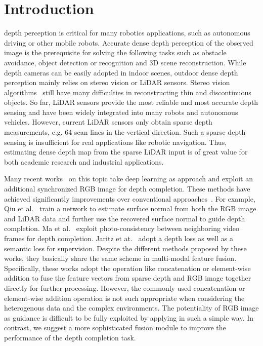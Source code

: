 \documentclass[journal]{IEEEtran}
\begin{document}
\section{Introduction}
 depth perception is critical for many robotics applications, such as autonomous driving or other mobile robots.
Accurate dense depth perception of the observed image is the prerequisite for solving the following tasks such as obstacle avoidance, object detection or recognition
and 3D scene reconstruction.
While depth cameras can be easily adopted in indoor scenes, outdoor dense depth perception mainly relies on stereo vision or LiDAR sensors.
Stereo vision algorithms~\cite{sgm,middleburry,cnn_stereo, efficient_stereo} still have many difficulties in reconstructing thin and discontinuous objects.
So far, LiDAR sensors provide the most reliable and most accurate depth sensing and have been widely integrated into many robots and autonomous vehicles.
However, current LiDAR sensors only obtain sparse depth measurements, e.g. 64 scan lines in the vertical direction.
Such a sparse depth sensing is insufficient for real applications like robotic navigation.
Thus, estimating dense depth map from the sparse LiDAR input is of great value for both academic research and industrial applications.
 

Many recent works~\cite{sparsity_cnn, deep_lidar, self_supervised}  on this topic take deep learning as approach and exploit an additional synchronized RGB image for depth completion.
These methods have achieved significantly improvements over conventional approaches~\cite{dense_disparity,sparse_sample,defense_classical}.
For example,  Qiu et al.~\cite{deep_lidar} train a network to estimate surface normal from both the RGB image and LiDAR data and further use the recovered surface normal to guide depth completion.
Ma et al.~\cite{self_supervised} exploit photo-consistency between neighboring video frames for depth completion.
Jaritz et at.~\cite{depth_comp_semantic} adopt a depth loss as well as a semantic loss for supervision.
Despite the different methods proposed by these works, they basically share the same scheme in multi-modal feature fusion.
Specifically,
these works adopt the operation like concatenation or element-wise addition to fuse the feature vectors from sparse depth and RGB image together directly for further processing.
However, the commonly used concatenation or element-wise addition operation is not such appropriate when considering the heterogenous data and the complex environments.
The potentiality of RGB image as guidance is difficult to be fully exploited by applying in such a simple way.
In contrast, we suggest a more sophisticated fusion module to improve the performance of the depth completion task.
\end{document}
